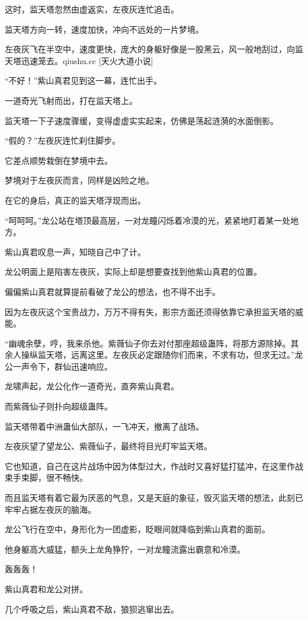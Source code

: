 \begin{this_body}
这时，监天塔忽然由虚返实，左夜灰连忙追击。

监天塔方向一转，速度加快，冲向不远处的一片梦境。

左夜灰飞在半空中，速度更快，庞大的身躯好像是一股黑云，风一般地刮过，向监天塔迅速笼去。qiushu.cc [天火大道小说]

“不好！”紫山真君见到这一幕，连忙出手。

一道奇光飞射而出，打在监天塔上。

监天塔一下子速度骤缓，变得虚虚实实起来，仿佛是荡起涟漪的水面倒影。

“假的？”左夜灰连忙刹住脚步。

它差点顺势栽倒在梦境中去。

梦境对于左夜灰而言，同样是凶险之地。

在它的身后，真正的监天塔浮现而出。

“呵呵呵。”龙公站在塔顶最高层，一对龙瞳闪烁着冷漠的光，紧紧地盯着某一处地方。

紫山真君叹息一声，知晓自己中了计。

龙公明面上是陷害左夜灰，实际上却是想要查找到他紫山真君的位置。

偏偏紫山真君就算提前看破了龙公的想法，也不得不出手。

因为左夜灰这个宝贵战力，万万不得有失，影宗方面还须得依靠它承担监天塔的威能。

“幽魂余孽，哼，我来杀他。紫薇仙子你去对付那座超级蛊阵，将那方源除掉。其余人操纵监天塔，远离这里。左夜灰必定跟随你们而来，不求有功，但求无过。”龙公一声令下，群仙迅速响应。

龙啸声起，龙公化作一道奇光，直奔紫山真君。

而紫薇仙子则扑向超级蛊阵。

监天塔带着中洲蛊仙大部队，一飞冲天，撤离了战场。

左夜灰望了望龙公、紫薇仙子，最终将目光盯牢监天塔。

它也知道，自己在这片战场中因为体型过大，作战时又喜好猛打猛冲，在这里作战束手束脚，很不畅快。

而且监天塔有着它最为厌恶的气息，又是天庭的象征，毁灭监天塔的想法，此刻已牢牢占据左夜灰的脑海。

龙公飞行在空中，身形化为一团虚影，眨眼间就降临到紫山真君的面前。

他身躯高大威猛，额头上龙角狰狞，一对龙瞳流露出霸意和冷漠。

轰轰轰！

紫山真君和龙公对拼。

几个呼吸之后，紫山真君不敌，狼狈逃窜出去。


\end{this_body}
